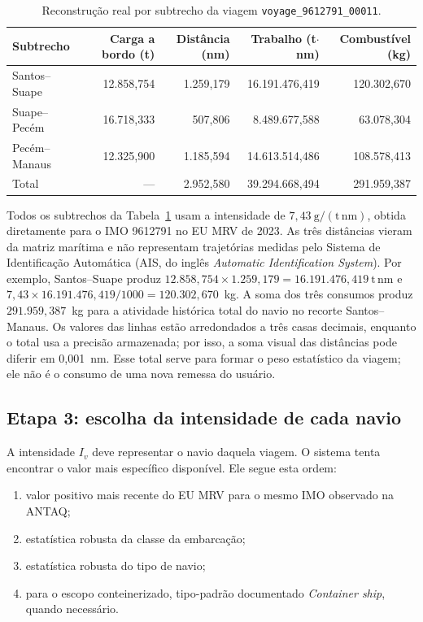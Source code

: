 \begin{table}[htbp]
\centering
\small
\caption{Reconstrução real por subtrecho da viagem \texttt{voyage\_9612791\_00011}.}
\label{tab:exemplo-real-subtrechos}
\begin{tabular}{lrrrr}
\toprule
Subtrecho & Carga a bordo (t) & Distância (nm) & Trabalho (t$\cdot$nm) & Combustível (kg) \\
\midrule
Santos--Suape & 12.858,754 & 1.259,179 & 16.191.476,419 & 120.302,670 \\
Suape--Pecém & 16.718,333 & 507,806 & 8.489.677,588 & 63.078,304 \\
Pecém--Manaus & 12.325,900 & 1.185,594 & 14.613.514,486 & 108.578,413 \\
\midrule
Total & --- & 2.952,580 & 39.294.668,494 & 291.959,387 \\
\bottomrule
\end{tabular}
\end{table}

Todos os subtrechos da Tabela~\ref{tab:exemplo-real-subtrechos} usam a intensidade de \(7{,}43~\mathrm{g/(t\,nm)}\), obtida diretamente para o IMO 9612791 no EU MRV de 2023. As três distâncias vieram da matriz marítima e não representam trajetórias medidas pelo Sistema de Identificação Automática (AIS, do inglês \emph{Automatic Identification System}). Por exemplo, Santos--Suape produz \(12.858{,}754\times1.259{,}179=16.191.476{,}419~\mathrm{t\,nm}\) e \(7{,}43\times16.191.476{,}419/1000=120.302{,}670\)~kg. A soma dos três consumos produz \(291.959{,}387\)~kg para a atividade histórica total do navio no recorte Santos--Manaus. Os valores das linhas estão arredondados a três casas decimais, enquanto o total usa a precisão armazenada; por isso, a soma visual das distâncias pode diferir em 0,001~nm. Esse total serve para formar o peso estatístico da viagem; ele não é o consumo de uma nova remessa do usuário.

\subsection*{Etapa 3: escolha da intensidade de cada navio}

A intensidade \(I_v\) deve representar o navio daquela viagem. O sistema tenta encontrar o valor mais específico disponível. Ele segue esta ordem:

\begin{enumerate}
  \item valor positivo mais recente do EU MRV para o mesmo IMO observado na ANTAQ;
  \item estatística robusta da classe da embarcação;
  \item estatística robusta do tipo de navio;
  \item para o escopo conteinerizado, tipo-padrão documentado \emph{Container ship}, quando necessário.
\end{enumerate}

